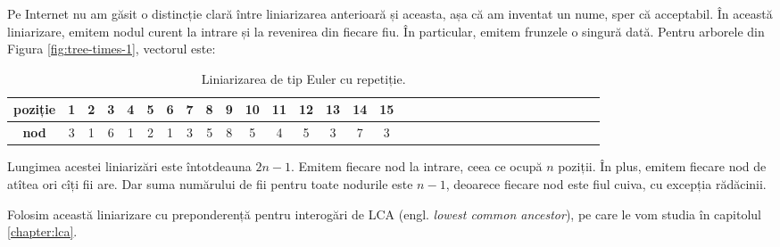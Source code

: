 \documentclass[../main.tex]{subfiles}
\begin{document}
Pe Internet nu am găsit o distincție clară între liniarizarea anterioară și aceasta, așa că am inventat un nume, sper că acceptabil. În această liniarizare, emitem nodul curent la intrare și la revenirea din fiecare fiu. În particular, emitem frunzele o singură dată. Pentru arborele din Figura \ref{fig:tree-times-1}, vectorul este:

\begin{table}[!htbp]
  \centering
  \begin{tabular}{ScScScScScScScScScScScScScScScSc}
    \textbf{poziție} & 1 & 2 & 3 & 4 & 5 & 6 & 7 & 8 & 9 & 10 & 11 & 12 & 13 & 14 & 15\\
    \hline
    \textbf{nod} & 3 & 1 & 6 & 1 & 2 & 1 & 3 & 5 & 8 & 5 & 4 & 5 & 3 & 7 & 3\\
  \end{tabular}

  \caption{Liniarizarea de tip Euler cu repetiție.}
\end{table}

Lungimea acestei liniarizări este întotdeauna $2n - 1$. Emitem fiecare nod la intrare, ceea ce ocupă $n$ poziții. În plus, emitem fiecare nod de atîtea ori cîți fii are. Dar suma numărului de fii pentru toate nodurile este $n - 1$, deoarece fiecare nod este fiul cuiva, cu excepția rădăcinii.

Folosim această liniarizare cu preponderență pentru interogări de LCA (engl. \textit{lowest common ancestor}), pe care le vom studia în capitolul \ref{chapter:lca}.
\end{document}
